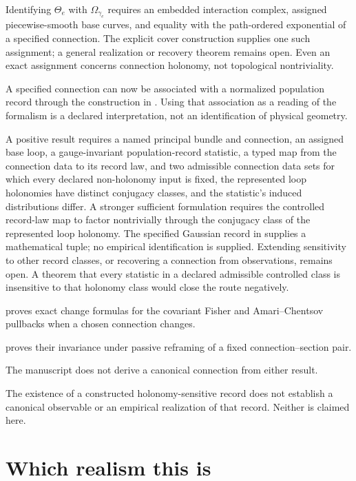 Identifying \(\Theta_e\) with
\(\Omega_{\gamma_e}\) requires an embedded interaction complex, assigned
piecewise-smooth base curves, and equality with the path-ordered exponential
of a specified connection. The explicit cover construction supplies one
such assignment; a general realization or recovery theorem remains open.
Even an exact assignment concerns connection holonomy, not topological
nontriviality. 

A specified connection can now be associated with a normalized population
record through the construction in .
Using that association as a reading of the formalism is a declared
interpretation, not an identification of physical geometry. 

A
positive result requires a named principal bundle and connection, an assigned
base loop, a gauge-invariant population-record statistic, a typed map from the
connection data to its record law, and two admissible connection data sets for
which every declared non-holonomy input is fixed, the represented loop
holonomies have distinct conjugacy classes, and the statistic's induced
distributions differ.  A stronger sufficient formulation requires the
controlled record-law map to factor nontrivially through the conjugacy class
of the represented loop holonomy. The specified Gaussian record in
 supplies a mathematical tuple;
no empirical identification is supplied. Extending sensitivity to other
record classes, or recovering a connection from observations, remains open.
A theorem that every statistic in
a declared admissible controlled class is insensitive to that holonomy class
would close the route negatively. 

 proves exact change formulas for the
covariant Fisher and Amari--Chentsov pullbacks when a chosen connection
changes. 

 proves their invariance under passive
reframing of a fixed connection--section pair. 

The manuscript does not derive a canonical connection from either result.

The existence of a constructed holonomy-sensitive record does not establish
a canonical observable or an empirical realization of that record. Neither
is claimed here. 

\section{Which realism this is}
\label{sec:phil-realism}

